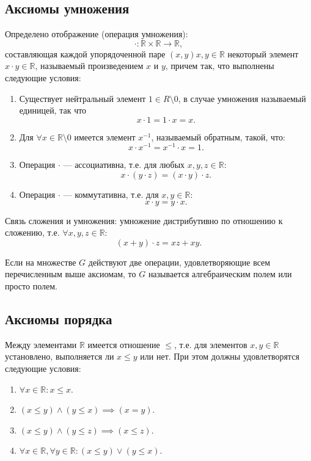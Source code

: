 \documentclass[12pt]{report}
\theoremstyle{plain}
\newcommand{\R}{\mathbb R}
\begin{document}
\subsection{Аксиомы умножения}
Определено отображение (операция умножения):
$$
\cdot: \R \times \R \rightarrow \R,
$$
составляющая каждой упорядоченной паре $(x, y) x, y \in \R$
некоторый элемент $x \cdot y \in \R$, называемый произведением $x$ и $y$,
причем так, что выполнены следующие условия:

\begin{enumerate}
\item Существует нейтральный элемент $1 \in R \setminus 0$,
в случае умножения называемый единицей, так что
$$
x \cdot 1 = 1 \cdot x = x.
$$

\item Для $\forall x \in \R \setminus 0$ имеется элемент $x^{-1}$, называемый
обратным, такой, что:
$$
x \cdot x^{-1} = x^{-1} \cdot x = 1.
$$

\item Операция $\cdot$ --- ассоциативна, т.е. для любых $x, y, z \in \R$:
$$
x\cdot (y \cdot z) = (x \cdot y) \cdot z.
$$

\item Операция $\cdot$ --- коммутативна, т.е. для $x, y \in \R$:
$$
x \cdot y = y \cdot x.
$$

\end{enumerate}

Связь сложения и умножения: умножение дистрибутивно по отношению к сложению, т.е.
$\forall x, y, z \in \R$:
$$
(x + y) \cdot z = xz + xy.
$$

Если на множестве $G$ действуют две операции, удовлетворяющие всем перечисленным выше аксиомам,
то $G$ называется алгебраическим полем или просто полем.

\subsection{Аксиомы порядка}
Между элементами $\R$ имеется отношение $\le$, т.е. для элементов $x, y \in \R$ установлено,
выполняется ли $x \le y$ или нет. При этом должны удовлетворятся следующие условия:

\begin{enumerate}
\item $\forall x \in \R: x \le x$.
\item $(x \le y) \land (y \le x) \implies (x = y)$.
\item $(x \le y) \land (y \le z) \implies (x \le z)$.
\item $\forall x \in \R, \forall y \in \R: (x \le y) \lor (y \le x)$.
\end{enumerate}
\end{document}
